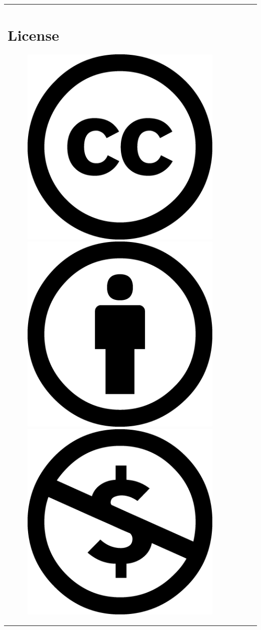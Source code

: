 \documentclass[10pt, oneside]{book}
\begin{document}
\begin{table}[h]
\begin{tabular}{l l l l}
	\section*{License}
\begin{figure}[h]
	\centering
	\includegraphics[scale=0.1]{cc.png}
	\includegraphics[scale=0.1]{by.png}
	\includegraphics[scale=0.1]{nc.png}

\end{figure}
\end{tabular}
\end{table}
\end{document}
